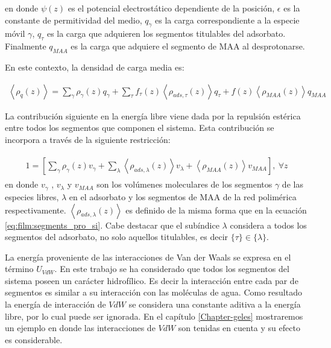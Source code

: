 \noindent en donde $\psi(z)$ es el potencial electrost\'atico dependiente de la posici\'on, $\epsilon$ es la constante de permitividad del medio, $q_\gamma$ es la carga correspondiente a la especie m\'ovil $\gamma$, $q_\tau$ es la carga que adquieren los segmentos titulables del adsorbato. Finalmente $q_{MAA}$ es la carga que adquiere el segmento de MAA al desprotonarse.


En este contexto, la densidad de carga media es:

\begin{align}
	\left<\rho_q(z)\right> = \sum_{\gamma } {\rho_\gamma(z) q_\gamma + \sum_\tau{f_\tau(z) \left<\rho_{ads,\tau}(z)\right> q_\tau} +  f(z)\left<\rho_{MAA}(z)\right>}q_{MAA}
	\label{eq:film:rho_charge}
\end{align}

La contribuci\'on siguiente en la energ\'ia libre viene dada por la repulsi\'on est\'erica entre  todos los segmentos que componen  el sistema. Esta contribuci\'on se incorpora a trav\'es de la siguiente restricci\'on:  

\begin{align}
	\begin{aligned}
		1=  {\left[\sum_{\gamma}\rho_\gamma(z) v_\gamma + \sum_\lambda{\left<\rho_{ads,\lambda}(z)\right>v_\lambda} + \left<\rho_{MAA}(z)\right>v_{MAA} \right]},~ \forall z
	\end{aligned}
	\label{eq:film:constraint}
\end{align}
\noindent en donde $v_\gamma$ , $v_\lambda$ y $v_{MAA}$ son los vol\'umenes moleculares de los segmentos $\gamma$ de las especies libres, $\lambda$  en el adsorbato y los segmentos de MAA de la red polim\'erica respectivamente.
$\left<\rho_{ads,\lambda}(z)\right>$ es definido de la misma forma que en la ecuaci\'on  \ref{eq:film:segments_pro_si}.
Cabe destacar que el sub\'indice $\lambda$ considera a todos los segmentos del adsorbato, no solo aquellos titulables, es decir $ \{\tau \}  \in \{\lambda \}$.

La energ\'ia proveniente de las interacciones de Van der Waals se expresa en el t\'ermino $U_{VdW}$. En este trabajo se ha considerado que todos los segmentos del sistema poseen un car\'acter hidrof\'ilico. Es decir la interacci\'on entre cada par de segmentos es similar a su interacci\'on con las mol\'eculas de agua. Como resultado la energ\'ia de interacci\'on de $VdW$ se considera una constante aditiva a la energ\'ia libre, por lo cual puede ser ignorada. En el cap\'itulo \ref{Chapter-geles} mostraremos un ejemplo en donde las interacciones de $VdW$ son tenidas en cuenta y su efecto es considerable. 

